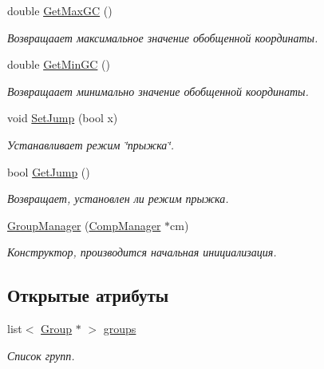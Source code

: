 \begin{DoxyCompactItemize}
double \hyperlink{class_group_manager_a7600fc05f8540db35c4eca2a67616f4a}{GetMaxGC} ()
\begin{DoxyCompactList}\small\item\em Возвращаает максимальное значение обобщенной координаты. \item\end{DoxyCompactList}\item 
double \hyperlink{class_group_manager_a72841948a7eba9945ac748db4eac7134}{GetMinGC} ()
\begin{DoxyCompactList}\small\item\em Возвращаает минимально значение обобщенной координаты. \item\end{DoxyCompactList}\item 
void \hyperlink{class_group_manager_a12e6e41645ff6f838cd6816529e1fc9c}{SetJump} (bool x)
\begin{DoxyCompactList}\small\item\em Устанавливает режим \char`\"{}прыжка\char`\"{}. \item\end{DoxyCompactList}\item 
bool \hyperlink{class_group_manager_a9d61ed908fb2c4b55b3bc832d1910e8a}{GetJump} ()
\begin{DoxyCompactList}\small\item\em Возвращает, установлен ли режим прыжка. \item\end{DoxyCompactList}\item 
\hyperlink{class_group_manager_ac7985f9186c573796ce0d6b693d1059c}{GroupManager} (\hyperlink{class_comp_manager}{CompManager} $\ast$cm)
\begin{DoxyCompactList}\small\item\em Конструктор, производится начальная инициализация. \item\end{DoxyCompactList}\end{DoxyCompactItemize}
\subsection*{Открытые атрибуты}
\begin{DoxyCompactItemize}
\item 
list$<$ \hyperlink{class_group}{Group} $\ast$ $>$ \hyperlink{class_group_manager_ab8a15542235512daae8cdab78042d891}{groups}
\begin{DoxyCompactList}\small\item\em Список групп. \item\end{DoxyCompactList}\end{DoxyCompactItemize}


